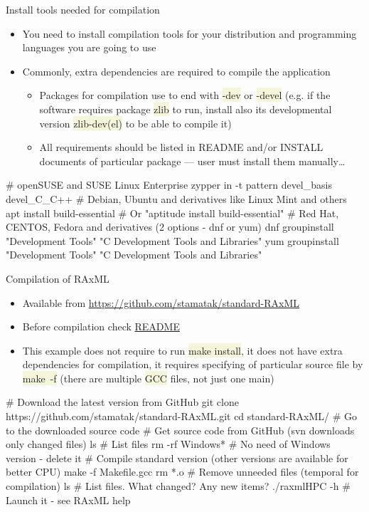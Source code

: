 \documentclass[compress, xelatex, 11pt, xcolor=svgnames, aspectratio=169, url={hyphens, lowtilde}]{beamer}
\renewcommand{\texttt}[1]{\colorbox{Beige}{{\ttfamily #1}}}
\begin{document}
\begin{frame}[fragile]{Install tools needed for compilation}
	\begin{itemize}
		\item You need to install compilation tools for your distribution and programming languages you are going to use
		\item Commonly, extra dependencies are required to compile the application
		\begin{itemize}
			\item Packages for compilation use to end with \texttt{-dev} or \texttt{-devel} (e.g. if the software requires package \texttt{zlib} to run, install also its developmental version \texttt{zlib-dev(el)} to be able to compile it)
			\item All requirements should be listed in README and/or INSTALL documents of particular package --- user must install them manually\ldots
		\end{itemize}
	\end{itemize}
	\vfill
	\begin{bashcode}
    # openSUSE and SUSE Linux Enterprise
    zypper in -t pattern devel_basis devel_C_C++
    # Debian, Ubuntu and derivatives like Linux Mint and others
    apt install build-essential # Or "aptitude install build-essential"
    # Red Hat, CENTOS, Fedora and derivatives (2 options - dnf or yum)
    dnf groupinstall "Development Tools" "C Development Tools and Libraries"
    yum groupinstall "Development Tools" "C Development Tools and Libraries"
	\end{bashcode}
\end{frame}

\begin{frame}[fragile]{Compilation of RAxML}
	\begin{itemize}
		\item Available from \url{https://github.com/stamatak/standard-RAxML}
		\item Before compilation check \href{https://github.com/stamatak/standard-RAxML/blob/master/README.md}{README}
		\item This example does not require to run \texttt{make install}, it does not have extra dependencies for compilation, it requires specifying of particular source file by \texttt{make~-f} (there are multiple \texttt{GCC} files, not just one main)
	\end{itemize}
	\begin{bashcode}
    # Download the latest version from GitHub
    git clone https://github.com/stamatak/standard-RAxML.git
    cd standard-RAxML/ # Go to the downloaded source code
    # Get source code from GitHub (svn downloads only changed files)
    ls # List files
    rm -rf Windows* # No need of Windows version - delete it
    # Compile standard version (other versions are available for better CPU)
    make -f Makefile.gcc
    rm *.o # Remove unneeded files (temporal for compilation)
    ls # List files. What changed? Any new items?
    ./raxmlHPC -h # Launch it - see RAxML help
	\end{bashcode}
\end{frame}
\end{document}
